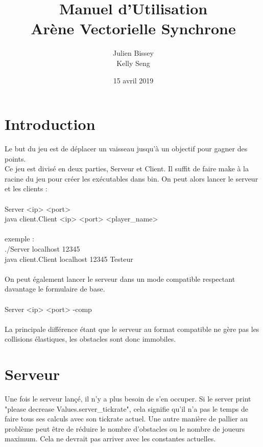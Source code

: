 \documentclass{article}
\begin{document}
\title{Manuel d'Utilisation\\
Arène Vectorielle Synchrone{}}
\author{Julien Bissey\\Kelly Seng}
\date{15 avril 2019}

\maketitle

\section{Introduction}
Le but du jeu est de déplacer un vaisseau jusqu'à un objectif pour gagner des points.\\
Ce jeu est divisé en deux parties, Serveur et Client.
Il suffit de faire make à la racine du jeu pour créer les exécutables dans bin.
On peut alors lancer le serveur et les clients :\\
\\
Server <ip> <port>\\
java client.Client <ip> <port> <player\_name>\\
\\
exemple :\\
./Server localhost 12345\\
java client.Client localhost 12345 Testeur\\
\\
On peut également lancer le serveur dans un mode compatible respectant davantage le formulaire de base.\\
\\
Server <ip> <port> -comp\\
\\
La principale différence étant que le serveur au format compatible ne gère pas les collisions élastiques, les obstacles sont donc immobiles.

\section{Serveur}

Une fois le serveur lançé, il n'y a plus besoin de s'en occuper.
Si le server print "please decrease Values.server\_tickrate", cela signifie qu'il n'a pas le temps
de faire tous ses calculs avec son tickrate actuel. Une autre manière de pallier au problème peut être de réduire le nombre d'obstacles ou le nombre de joueurs maximum.
Cela ne devrait pas arriver avec les constantes actuelles.\\
\end{document}
